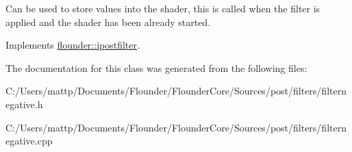 Can be used to store values into the shader, this is called when the filter is applied and the shader has been already started. 



Implements \hyperlink{classflounder_1_1ipostfilter_a9b658b4672718d5ac36539875bde722e}{flounder\+::ipostfilter}.



The documentation for this class was generated from the following files\+:\begin{DoxyCompactItemize}
\item 
C\+:/\+Users/mattp/\+Documents/\+Flounder/\+Flounder\+Core/\+Sources/post/filters/filternegative.\+h\item 
C\+:/\+Users/mattp/\+Documents/\+Flounder/\+Flounder\+Core/\+Sources/post/filters/filternegative.\+cpp\end{DoxyCompactItemize}
